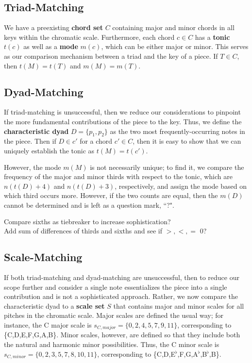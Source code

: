 \documentclass[11pt]{article}
\begin{document}
\subsection{Triad-Matching}

We have a preexisting {\bf chord set} $C$ containing major and minor chords in all keys within the chromatic scale. Furthermore, each chord $c\in C$ has a {\bf tonic} $t(c)$ as well as a {\bf mode} $m(c)$, which can be either major or minor. This serves as our comparison mechanism between a triad and the key of a piece. If $T\in C$, then $t(M)=t(T)$ and $m(M)=m(T)$.

\subsection{Dyad-Matching}

If triad-matching is unsuccessful, then we reduce our considerations to pinpoint the more fundamental contributions of the piece to the key. Thus, we define the {\bf characteristic dyad} $D=\{p_1,p_2\}$ as the two most frequently-occurring notes in the piece. Then if $D\in c'$ for a chord $c'\in C$, then it is easy to show that we can uniquely establish the tonic as $t(M)=t(c')$. 

However, the mode $m(M)$ is not necessarily unique; to find it, we compare the frequency of the major and minor thirds with respect to the tonic, which are $n(t(D)+4)$ and $n(t(D)+3)$, respectively, and assign the mode based on which third occurs more. However, if the two counts are equal, then the $m(D)$ cannot be determined and is left as a question mark, ``?".

{\color{red} 
\noindent Compare sixths as tiebreaker to increase sophistication?\\
Add sum of differences of thirds and sixths and see if $>, <, =$ 0?\\
}

\subsection{Scale-Matching}
If both triad-matching and dyad-matching are unsuccessful, then to reduce our scope further and consider a single note essentializes the piece into a single contribution and is not a sophisticated approach. Rather, we now compare the characteristic dyad to a {\bf scale set} $S$ that contains major and minor scales for all pitches in the chromatic scale. Major scales are defined the usual way; for instance, the C major scale is $s_{C,major} = \{0,2,4,5,7,9,11\}$, corresponding to \{C,D,E,F,G,A,B\}. Minor scales, however, are defined so that they include both the natural and harmonic minor possibilities. Thus, the C minor scale is $s_{C,minor} = \{0,2,3,5,7,8,10,11\}$, corresponding to \{C,D,E$^{\flat}$,F,G,A$^{\flat}$,B$^{\flat}$,B\}.
\end{document}
